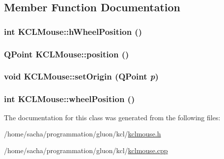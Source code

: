 \subsection{Member Function Documentation}
\hypertarget{class_k_c_l_mouse_75f221554270e5bcffdf6b671a62f01a}{
\subsubsection[{hWheelPosition}]{\setlength{\rightskip}{0pt plus 5cm}int KCLMouse::hWheelPosition ()}}
\label{class_k_c_l_mouse_75f221554270e5bcffdf6b671a62f01a}


\hypertarget{class_k_c_l_mouse_0385a723fb0ec739f8943627764a53fb}{
\subsubsection[{position}]{\setlength{\rightskip}{0pt plus 5cm}QPoint KCLMouse::position ()}}
\label{class_k_c_l_mouse_0385a723fb0ec739f8943627764a53fb}


\hypertarget{class_k_c_l_mouse_248e212988997339bb762b9dcc815c96}{
\subsubsection[{setOrigin}]{\setlength{\rightskip}{0pt plus 5cm}void KCLMouse::setOrigin (QPoint {\em p})}}
\label{class_k_c_l_mouse_248e212988997339bb762b9dcc815c96}


\hypertarget{class_k_c_l_mouse_a913b0b518584db62a341ad75ee49119}{
\subsubsection[{wheelPosition}]{\setlength{\rightskip}{0pt plus 5cm}int KCLMouse::wheelPosition ()}}
\label{class_k_c_l_mouse_a913b0b518584db62a341ad75ee49119}




The documentation for this class was generated from the following files:\begin{CompactItemize}
\item 
/home/sacha/programmation/gluon/kcl/\hyperlink{kclmouse_8h}{kclmouse.h}\item 
/home/sacha/programmation/gluon/kcl/\hyperlink{kclmouse_8cpp}{kclmouse.cpp}\end{CompactItemize}
